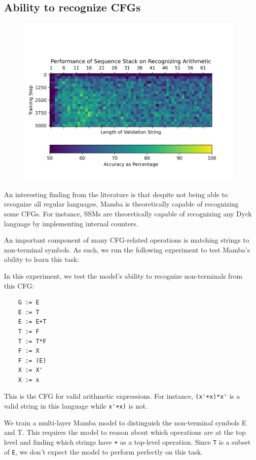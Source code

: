\subsection{Ability to recognize CFGs}
\begin{figure}
    \includegraphics[width=\textwidth]{figures/arithmetic.png}
    \caption{}
    \label{resultsarithmetic}
\end{figure}
An interesting finding from the literature is that despite not being able to
recognize all regular languages, Mamba is theoretically capable of recognizing
some CFGs. For instance, SSMs are theoretically capable of recognizing any Dyck
language by implementing internal counters\cite{ssmformal}.

An important component of many CFG-related operations is matching strings to
non-terminal symbols.
As such, we run the following experiment to test Mamba's ability to learn this
task:

In this experiment, we test the model's ability to recognize non-terminals from
this CFG:
\begin{verbatim}
    G := E
    E := T
    E := E+T
    T := F
    T := T*F
    F := X
    F := (E)
    X := X'
    X := x
\end{verbatim}
This is the CFG for valid arithmetic expressions.
For instance, \verb|(x'+x)*x'| is a valid string in this language while
\verb|x'+x)| is not.

We train a multi-layer Mamba model to distinguish the non-terminal symbols E and
T.
This requires the model to reason about which operations are at the top level
and finding which strings have \verb|+| as a top-level operation.
Since \verb|T| is a subset of \verb|E|, we don't expect the model to perform
perfectly on this task.

